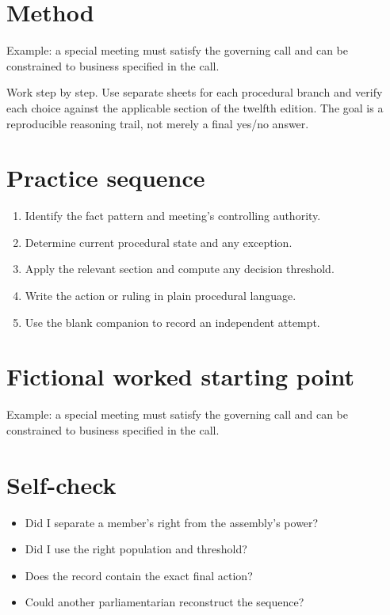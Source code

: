 \documentclass[11pt]{article}
\begin{document}
\SuiteOpen
\section{Method}
Example: a special meeting must satisfy the governing call and can be constrained to business specified in the call.

Work step by step. Use separate sheets for each procedural branch and verify each choice against the applicable section of the twelfth edition. The goal is a reproducible reasoning trail, not merely a final yes/no answer.

\section{Practice sequence}
\begin{enumerate}[leftmargin=*,itemsep=4pt]
\item Identify the fact pattern and meeting’s controlling authority.
\item Determine current procedural state and any exception.
\item Apply the relevant section and compute any decision threshold.
\item Write the action or ruling in plain procedural language.
\item Use the blank companion to record an independent attempt.
\end{enumerate}

\section{Fictional worked starting point}
Example: a special meeting must satisfy the governing call and can be constrained to business specified in the call.

\section{Self-check}
\begin{itemize}[leftmargin=*,itemsep=4pt]
\item Did I separate a member’s right from the assembly’s power?
\item Did I use the right population and threshold?
\item Does the record contain the exact final action?
\item Could another parliamentarian reconstruct the sequence?
\end{itemize}
\end{document}
